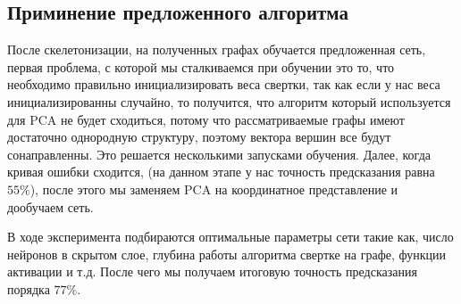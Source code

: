 \documentclass[12pt, twoside]{article}
\begin{document}
\subsection{Приминение предложенного алгоритма}
После скелетонизации, на полученных графах обучается предложенная сеть, первая проблема, с которой мы сталкиваемся при обучении это то, что необходимо правильно инициализировать веса свертки, так как если у нас веса инициализированны случайно, то получится, что алгоритм который используется для PCA не будет сходиться, потому что рассматриваемые графы имеют достаточно однородную структуру, поэтому вектора вершин все будут сонаправленны. Это решается несколькими запусками обучения. Далее, когда кривая ошибки сходится, (на данном этапе у нас точность предсказания равна $55\%$), после этого мы заменяем PCA на координатное представление и дообучаем сеть. 

В ходе эксперимента подбираются оптимальные параметры сети такие как, число нейронов в скрытом слое, глубина работы алгоритма свертке на графе, функции активации и т.д. После чего мы получаем итоговую точность предсказания порядка $77\%$.
\end{document}

